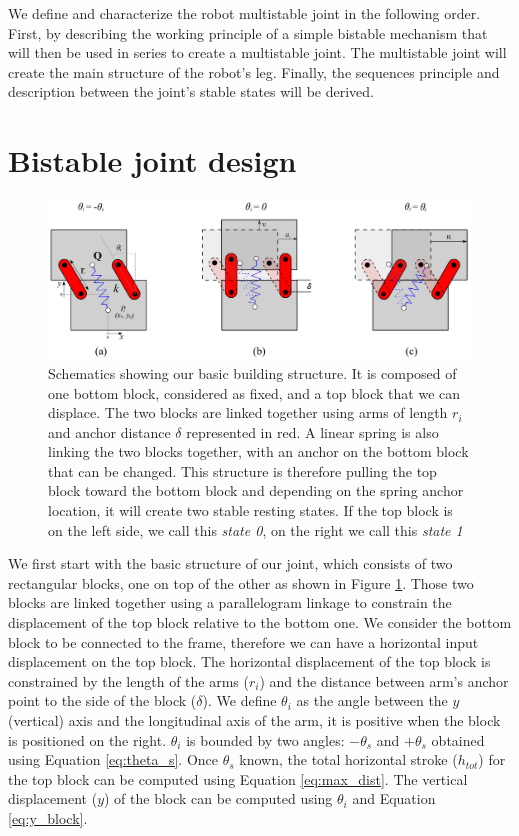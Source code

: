     We define and characterize the robot multistable joint in the following order. First, by describing the working principle of a simple bistable mechanism that will then be used in series to create a multistable joint. The multistable joint will create the main structure of the robot's leg. Finally, the sequences principle and description between the joint's stable states will be derived.

    \section{Bistable joint design}
    \label{sec:bistable}
    \begin{figure}
        \centering
        \includegraphics[width=1.0\textwidth]{images/basics_building_blocks.png}
        \caption{Schematics showing our basic building structure. It is composed of one bottom block, considered as fixed, and a top block that we can displace. The two blocks are linked together using arms of length $r_i$ and anchor distance $\delta$ represented in red. A linear spring is also linking the two blocks together, with an anchor on the bottom block that can be changed. This structure is therefore pulling the top block toward the bottom block and depending on the spring anchor location, it will create two stable resting states. If the top block is on the left side, we call this \textit{state 0}, on the right we call this \textit{state 1}}
        \label{fig:joint_basics}
    \end{figure}
    We first start with the basic structure of our joint, which consists of two rectangular blocks, one on top of the other as shown in Figure \ref{fig:joint_basics}. Those two blocks are linked together using a parallelogram linkage to constrain the displacement of the top block relative to the bottom one. We consider the bottom block to be connected to the frame, therefore we can have a horizontal input displacement on the top block. The horizontal displacement of the top block is constrained by the length of the arms ($r_i$) and the distance between arm's anchor point to the side of the block ($\delta$). We define $\theta_i$ as the angle between the $y$ (vertical) axis and the longitudinal axis of the arm, it is positive when the block is positioned on the right. $\theta_i$ is bounded by two angles: $-\theta_s$ and $+\theta_s$ obtained using Equation \ref{eq:theta_s}. Once $\theta_s$ known, the total horizontal stroke ($h_{tot}$) for the top block can be computed using Equation \ref{eq:max_dist}. The vertical displacement ($y$) of the block can be computed using $\theta_i$ and Equation \ref{eq:y_block}.
    
